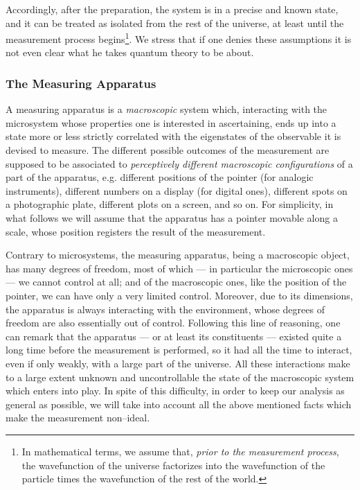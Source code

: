 \documentclass[10pt,a4paper]{article}
\begin{document}
Accordingly, after the preparation, the system is in a precise and
known state, and it can be treated as isolated from the rest of
the universe, at least until  the measurement process
begins\footnote{In mathematical terms,  we assume that, {\it prior
to the measurement process},  the wavefunction of the universe
factorizes into the wavefunction of the particle times the
wavefunction of the rest of the world.}. We stress that if one
denies these assumptions it is not even clear what he takes
quantum theory to be about.


\subsubsection{The Measuring Apparatus} \label{sec222}

A measuring apparatus is a {\it macroscopic} system which,
interacting with the microsystem whose properties one is
interested in ascertaining, ends up into a state more or less
strictly correlated with the eigenstates of the observable it is
devised to measure. The different possible outcomes of the
measurement are supposed to be associated to {\it perceptively
different macroscopic configurations} of a part of the apparatus,
e.g. different positions of the pointer (for analogic
instruments), different numbers on a display (for digital ones),
different spots on a photographic plate, different plots on a
screen, and so on. For simplicity, in what follows we will assume
that the apparatus has a pointer  movable along a scale, whose
position registers the result of the measurement.

Contrary to microsystems, the measuring apparatus, being a
macroscopic object, has many degrees of freedom, most of which ---
in particular the microscopic ones --- we cannot control at all;
and of the macroscopic ones, like the position of the pointer, we
can have only a very limited control. Moreover, due to its
dimensions, the apparatus is always interacting with the
environment, whose degrees of freedom are also essentially out of
control. Following this line of reasoning, one can remark that the
apparatus --- or at least its constituents --- existed quite a
long time before the measurement is performed, so it had all the
time to interact, even if only weakly, with a large part of the
universe. All these interactions make to a large extent unknown
and uncontrollable the state of the macroscopic system which
enters into play. In spite of this difficulty, in order to keep
our analysis as general as possible, we will take into account all
the above mentioned facts which make the measurement non--ideal.
\end{document}
